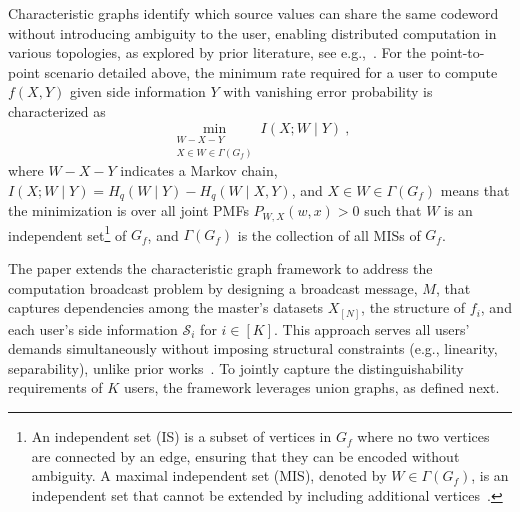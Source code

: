 \documentclass[conference, letterpaper]{IEEEtran} %
\begin{document}
Characteristic graphs identify which source values can share the same codeword without introducing ambiguity to the user, enabling distributed computation in various topologies, as explored by prior literature, see e.g.,~\cite{AlonOrlit1996, OrlRoc2001,feizi2014network, salehi2023achievable, malak2024multi, malak2024multis,korner1973coding,malak2023distributed}. For the point-to-point scenario detailed above, the minimum rate required for a user to compute $f(X, Y)$ given side information $Y$ with vanishing error probability is characterized as~\cite{OrlRoc2001}
\begin{equation}
\label{eq:Rate_ach}
    \min_{\substack{W-X-Y\\X\in W\in \Gamma(G_f)}} I(X;W\mid Y) \ ,
\end{equation}
where $W-X-Y$ indicates a Markov chain,  $I(X; W \mid Y)=H_{q}(W\mid Y)-H_{q}(W\mid X, Y)$, and  $X\in W\in \Gamma(G_f)$ means that the minimization is over all joint PMFs $P_{W, X}(w,x)>0$ such that $W$ is an independent set\footnote{An independent set (IS) is a subset of vertices in $G_f$ where no two vertices are connected by an edge, ensuring that they can be encoded without ambiguity. A maximal independent set (MIS), denoted by $W\in \Gamma(G_f)$, is an independent set that cannot be extended by including additional vertices~\cite{beigel1999finding}.} of $G_f$, and $\Gamma(G_f)$ is the collection of all MISs of $G_f$.  

The paper extends the characteristic graph framework to address the computation broadcast problem by designing a broadcast message, $M$, that captures dependencies among the master's datasets $X_{[N]}$, the structure of $f_i$, and each user's side information $\mathcal{S}_i$ for $i \in [K]$. This approach serves all users' demands simultaneously without imposing structural constraints (e.g., linearity, separability), unlike prior works~\cite{sun2019capacity,ravi2016broadcast,yao2024capacity,yao2024generic}. To jointly capture the distinguishability requirements of $K$ users, the framework leverages union graphs, as defined next.
\end{document}
